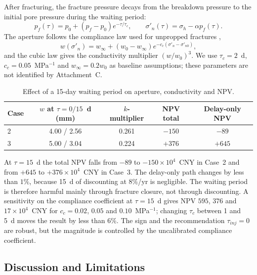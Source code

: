 After fracturing, the fracture pressure decays from the breakdown pressure to
the initial pore pressure during the waiting period:
\begin{equation}
p_f(\tau)=p_0+\left(p_f-p_0\right)e^{-\tau/\tau_c},\qquad
\sigma'_n(\tau)=\sigma_h-\alpha p_f(\tau).
\label{eq:waiting_p}
\end{equation}
The aperture follows the compliance law used for unpropped fractures
\cite{p1-07,p1-11},
\begin{equation}
w(\sigma'_n)=w_\infty+\left(w_0-w_\infty\right)
e^{-c_c\left(\sigma'_n-\sigma'_{n0}\right)},
\label{eq:waiting_w}
\end{equation}
and the cubic law gives the conductivity multiplier $(w/w_0)^3$. We use
$\tau_c=2$~d, $c_c=0.05$~MPa$^{-1}$ and $w_\infty=0.2w_0$ as baseline
assumptions; these parameters are not identified by Attachment~C.

\begin{table}[h!t]
\centering
\caption{Effect of a 15-day waiting period on aperture, conductivity and NPV.}
\label{tbl:waiting}
\small
\begin{tabular}{lcccc}
\toprule[1.5pt]
Case & $w$ at $\tau=0/15$~d (mm) & $k$-multiplier & NPV total
& Delay-only NPV\\
\midrule[1pt]
2 & 4.00 / 2.56 & 0.261 & $-150$ & $-89$\\
3 & 5.00 / 3.04 & 0.224 & $+376$ & $+645$\\
\bottomrule[1.5pt]
\end{tabular}
\end{table}

At $\tau=15$~d the total NPV falls from $-89$ to $-150\times10^4$~CNY in
Case~2 and from $+645$ to $+376\times10^4$~CNY in Case~3. The delay-only path
changes by less than $1\%$, because 15~d of discounting at $8\%$/yr is
negligible. The waiting period is therefore harmful mainly through fracture
closure, not through discounting. A sensitivity on the compliance coefficient
at $\tau=15$~d gives NPV $595$, $376$ and $17\times10^4$~CNY for
$c_c=0.02$, $0.05$ and $0.10$~MPa$^{-1}$; changing $\tau_c$ between 1 and
5~d moves the result by less than $6\%$. The sign and the recommendation
$\tau_{inj}=0$ are robust, but the magnitude is controlled by the uncalibrated
compliance coefficient.

\subsection{Discussion and Limitations}
\label{sec:p3_limits}

